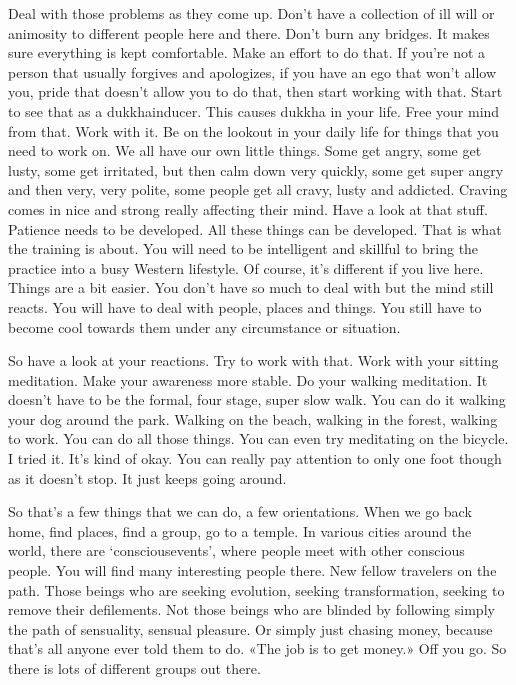 \documentclass[letterpaper,10pt,english]{sphinxmanual}
\begin{document}
\sphinxAtStartPar
Deal  with  those  problems  as  they  come  up.  Don’t  have  a  collection
of  ill  will  or  animosity  to  different  people  here  and  there.  Don’t  burn  any
bridges. It makes sure everything is kept comfortable. Make an effort to do
that. If you’re not a person that usually forgives and apologizes, if you have
an ego that won’t allow you, pride that doesn’t allow you to do that, then start
working with that. Start to see that as a dukkha\sphinxhyphen{}inducer. This causes dukkha
in your life. Free your mind from that. Work with it. Be on the lookout in
your daily life for things that you need to work on. We all have our own little
things.  Some  get  angry,  some  get  lusty,  some  get  irritated,  but  then  calm
down very quickly, some get super angry and then very, very polite, some
people get all cravy, lusty and addicted. Craving comes in nice and strong
really affecting their mind. Have a look at that stuff. Patience needs to be
developed. All  these  things  can  be  developed. That  is  what  the  training  is
about. You will need to be intelligent and skillful to bring the practice into a
busy Western lifestyle. Of course, it’s different if you live here. Things are a
bit easier. You don’t have so much to deal with but the mind still reacts. You
will have to deal with people, places and things. You still have to become
cool towards them under any circumstance or situation.

\sphinxAtStartPar
So  have  a  look  at  your  reactions.  Try  to  work  with  that.  Work  with
your sitting meditation. Make your awareness more stable. Do your walking meditation. It doesn’t have to be the formal, four stage, super slow walk.
You  can  do  it  walking  your  dog  around  the  park.  Walking  on  the  beach,
walking in the forest, walking to work. You can do all those things. You can
even try meditating on the bicycle. I tried it. It’s kind of okay. You can really
pay attention to only one foot though as it doesn’t stop. It just keeps going
around.

\sphinxAtStartPar
So  that’s  a  few  things  that  we  can  do,  a  few  orientations.  When  we
go  back  home,  find  places,  find  a  group,  go  to  a  temple.  In  various  cities
around  the  world,  there  are  ‘conscious\sphinxhyphen{}events’,  where  people  meet  with
other  conscious  people. You  will  find  many  interesting  people  there.  New
fellow travelers on the path. Those beings who are seeking evolution, seeking    transformation,  seeking  to  remove  their  defilements.  Not  those  beings
who are blinded by following simply the path of sensuality, sensual pleasure.
Or simply just chasing money, because that’s all anyone ever told them to
do. «The job is to get money.» Off you go. So there is lots of different groups
out there.
\end{document}
